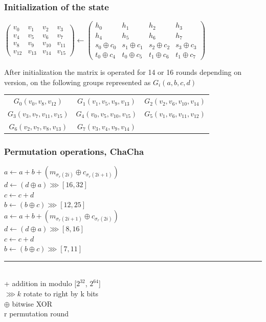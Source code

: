 \documentclass{beamer}
\begin{document}
\begin{frame}
\frametitle{Initialization of the state}
\begin{center}
$\begin{pmatrix} v_{0} & v_{1} & v_{2} & v_{3} \\ v_{4} & v_{5} & v_{6} & v_{7} \\
                 v_{8} & v_{9} & v_{10} & v_{11} \\ v_{12} & v_{13} & v_{14} & v_{15}\end{pmatrix} 
\gets
\begin{pmatrix} h_{0} & h_{1} & h_{2} & h_{3} \\ h_{4} & h_{5} & h_{6} & h_{7} \\
   s_{0} \oplus c_{0} & s_{1} \oplus c_{1} & s_{2} \oplus c_{2} & s_{3} \oplus c_{3} \\ 
   t_{0} \oplus c_{4} & t_{0} \oplus c_{5} & t_{1} \oplus c_{6} & t_{1} \oplus c_{7} \end{pmatrix}$
\end{center}
After initialization the matrix is operated for 14 or 16 rounds depending on version, on the following 
groups represented as $G_{i}(a, b, c, d)$
\begin{table}
  \begin{center}
    \begin{tabular}{ *{3}{c}}
    $ G_{0}(v_{0}, v_{8}, v_{12})$ & $G_{1}(v_{1}, v_{5}, v_{9}, v_{13})$ & $G_{2}(v_{2}, v_{6}, v_{10}, v_{14})$ \\
    $G_{3}(v_{3}, v_{7}, v_{11}, v_{15}) $ & $G_{4}(v_{0}, v_{5}, v_{10}, v_{15})$ & $G_{5}(v_{1}, v_{6}, v_{11}, v_{12})$ \\
    $G_{6}(v_{2}, v_{7}, v_{8}, v_{13})$ & $G_{7}(v_{3}, v_{4}, v_{9}, v_{14})$
    \end{tabular}
  \end{center}
\end{table}
\end{frame}

\begin{frame}
\frametitle{Permutation operations, ChaCha}
$a \gets a + b + (m_{\sigma_{r}(2i)} \oplus c_{\sigma_{r}(2i + 1)}) $ \\
$d \gets (d \oplus a) \ggg [16, 32]$ \\
$c \gets c + d$ \\
$b \gets (b \oplus c) \ggg [12, 25]$ \\
$a \gets a + b + (m_{\sigma_{r}(2i + 1)} \oplus c_{\sigma_{r}(2i)})$ \\
$d \gets (d \oplus a) \ggg [8, 16]$ \\
$c \gets c + d$ \\
$b \gets (b \oplus c) \ggg [7, 11]$ \\ 
\noindent\rule{10cm}{0.4pt} \\
\vspace{1mm}
+ addition in modulo [$2^{32}$, $2^{64}$] \\
$\ggg k$ rotate to right by k bits \\
$\oplus$ bitwise XOR \\
r permutation round \\
\end{frame}
\end{document}
